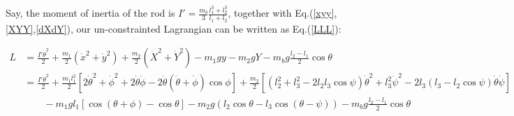 \documentclass[%
reprint,
amsmath,amssymb,
aps,
]{revtex4-1}
\begin{document}
	Say, the moment of inertia of the rod is $I'=\frac{m_b}{3}\frac{l_1^3+l_2^3}{l_1+l_2}$, together with Eq.(\ref{xyy},\ref{XYY},\ref{dXdY}), our un-constrainted Lagrangian can be written as Eq.(\ref{LLL}):
	\begin{widetext}
		\begin{equation}\label{LLL}
		\begin{aligned}
		L
		&=
		\frac{I'\dot{\theta}^2}{2} + \frac{m_1}{2}\left(\dot{x}^2 + \dot{y}^2\right) 
		+ \frac{m_2}{2}\left(\dot{X}^2 + \dot{Y}^2\right)
		-m_1gy -m_2gY - m_bg\frac{l_2-l_1}{2}\cos\theta\\
		&=
		\frac{I'\dot{\theta}^2}{2} + \frac{m_1 l_1^2}{2}\left[2\dot{\theta}^2+\dot{\phi}^2+2\dot{\theta}\dot{\phi}
		-2\dot{\theta}(\dot{\theta}+\dot{\phi})\cos\phi\right]
		+ \frac{m_2}{2}
		\left[(l_2^2+l_3^2-2l_2l_3\cos\psi)\dot{\theta}^2
		+l_3^2\dot{\psi}^2-
		2l_3(l_3 - l_2\cos\psi)\dot{\theta}\dot{\psi}\right]\\
		&\qquad
		-m_1 gl_1 \left[\cos(\theta + \phi) - \cos\theta\right]
		-m_2 g\left(l_2\cos \theta 
		- l_3\cos(\theta - \psi)\right)
		-m_bg\frac{l_2-l_1}{2}\cos\theta
		\end{aligned}
		\end{equation}
	\end{widetext}
	
\end{document}
